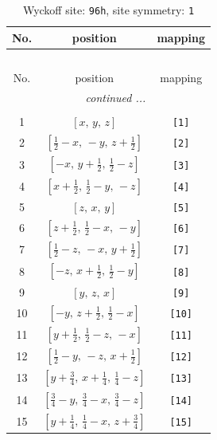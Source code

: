 \documentclass[fleqn,8pt]{jsarticle}
\begin{document}
\begin{longtable}{ccc}
\caption{Wyckoff site: {\tt 96h}, site symmetry: {\tt 1}}
 \\
 \hline \hline
No. & position & mapping \\ \hline \endfirsthead

\multicolumn{2}{l}{\tablename\ \thetable{}} \\
 \hline \hline
No. & position & mapping \\ \hline \endhead

 \hline \hline
\multicolumn{2}{r}{\footnotesize\it continued ...} \\ \endfoot

 \hline \hline
\multicolumn{2}{r}{} \\ \endlastfoot

1 & $\left[ x,\, y,\, z \right]$ & {\tt [1]} \\ \hline
2 & $\left[ \frac{1}{2} - x,\, - y,\, z + \frac{1}{2} \right]$ & {\tt [2]} \\ \hline
3 & $\left[ - x,\, y + \frac{1}{2},\, \frac{1}{2} - z \right]$ & {\tt [3]} \\ \hline
4 & $\left[ x + \frac{1}{2},\, \frac{1}{2} - y,\, - z \right]$ & {\tt [4]} \\ \hline
5 & $\left[ z,\, x,\, y \right]$ & {\tt [5]} \\ \hline
6 & $\left[ z + \frac{1}{2},\, \frac{1}{2} - x,\, - y \right]$ & {\tt [6]} \\ \hline
7 & $\left[ \frac{1}{2} - z,\, - x,\, y + \frac{1}{2} \right]$ & {\tt [7]} \\ \hline
8 & $\left[ - z,\, x + \frac{1}{2},\, \frac{1}{2} - y \right]$ & {\tt [8]} \\ \hline
9 & $\left[ y,\, z,\, x \right]$ & {\tt [9]} \\ \hline
10 & $\left[ - y,\, z + \frac{1}{2},\, \frac{1}{2} - x \right]$ & {\tt [10]} \\ \hline
11 & $\left[ y + \frac{1}{2},\, \frac{1}{2} - z,\, - x \right]$ & {\tt [11]} \\ \hline
12 & $\left[ \frac{1}{2} - y,\, - z,\, x + \frac{1}{2} \right]$ & {\tt [12]} \\ \hline
13 & $\left[ y + \frac{3}{4},\, x + \frac{1}{4},\, \frac{1}{4} - z \right]$ & {\tt [13]} \\ \hline
14 & $\left[ \frac{3}{4} - y,\, \frac{3}{4} - x,\, \frac{3}{4} - z \right]$ & {\tt [14]} \\ \hline
15 & $\left[ y + \frac{1}{4},\, \frac{1}{4} - x,\, z + \frac{3}{4} \right]$ & {\tt [15]} \\ \hline

\end{longtable}
\end{document}
